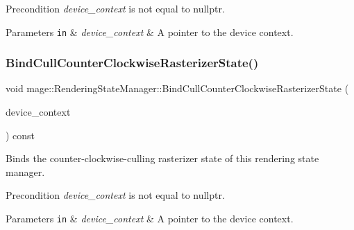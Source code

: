 \begin{DoxyPrecond}{Precondition}
{\itshape device\+\_\+context} is not equal to {\ttfamily nullptr}. 
\end{DoxyPrecond}

\begin{DoxyParams}[1]{Parameters}
\mbox{\tt in}  & {\em device\+\_\+context} & A pointer to the device context. \\
\hline
\end{DoxyParams}
\hypertarget{classmage_1_1_rendering_state_manager_ab1f026a97dcdad02229387e26bac77f3}{}\label{classmage_1_1_rendering_state_manager_ab1f026a97dcdad02229387e26bac77f3} 
\subsubsection{\texorpdfstring{Bind\+Cull\+Counter\+Clockwise\+Rasterizer\+State()}{BindCullCounterClockwiseRasterizerState()}}
{\footnotesize\ttfamily void mage\+::\+Rendering\+State\+Manager\+::\+Bind\+Cull\+Counter\+Clockwise\+Rasterizer\+State (\begin{DoxyParamCaption}\item[{I\+D3\+D11\+Device\+Context2 $\ast$}]{device\+\_\+context }\end{DoxyParamCaption}) const\hspace{0.3cm}{\ttfamily [noexcept]}}

Binds the counter-\/clockwise-\/culling rasterizer state of this rendering state manager.

\begin{DoxyPrecond}{Precondition}
{\itshape device\+\_\+context} is not equal to {\ttfamily nullptr}. 
\end{DoxyPrecond}

\begin{DoxyParams}[1]{Parameters}
\mbox{\tt in}  & {\em device\+\_\+context} & A pointer to the device context. \\
\hline
\end{DoxyParams}
\hypertarget{classmage_1_1_rendering_state_manager_ace3ec89a7bb648e82eab293901ba22c5}{}\label{classmage_1_1_rendering_state_manager_ace3ec89a7bb648e82eab293901ba22c5} 

